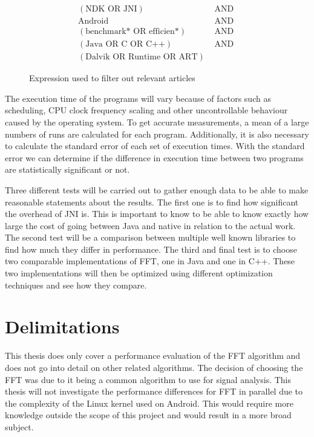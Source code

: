 \begin{figure}[H]
    \centering
    \begin{align*}
        (\text{NDK OR JNI})               & \text{ AND } \\
        \text{Android}                    & \text{ AND } \\
        (\text{benchmark* OR efficien*})  & \text{ AND } \\
        (\text{Java OR C OR C++})         & \text{ AND } \\
        (\text{Dalvik OR Runtime OR ART}) &
    \end{align*}
    \caption{Expression used to filter out relevant articles}
    \label{fig:db:search}
\end{figure}

The execution time of the programs will vary because of factors such as scheduling, CPU clock frequency scaling and other uncontrollable behaviour caused by the operating system. To get accurate measurements, a mean of a large numbers of runs are calculated for each program. Additionally, it is also necessary to calculate the standard error of each set of execution times. With the standard error we can determine if the difference in execution time between two programs are statistically significant or not.

Three different tests will be carried out to gather enough data to be able to make reasonable statements about the results. The first one is to find how significant the overhead of JNI is. This is important to know to be able to know exactly how large the cost of going between Java and native in relation to the actual work. The second test will be a comparison between multiple well known libraries to find how much they differ in performance. The third and final test is to choose two comparable implementations of FFT, one in Java and one in C++. These two implementations will then be optimized using different optimization techniques and see how they compare.

\section{Delimitations}
This thesis does only cover a performance evaluation of the FFT algorithm and does not go into detail on other related algorithms. The decision of choosing the FFT was due to it being a common algorithm to use for signal analysis. This thesis will not investigate the performance differences for FFT in parallel due to the complexity of the Linux kernel used on Android. This would require more knowledge outside the scope of this project and would result in a more broad subject.

